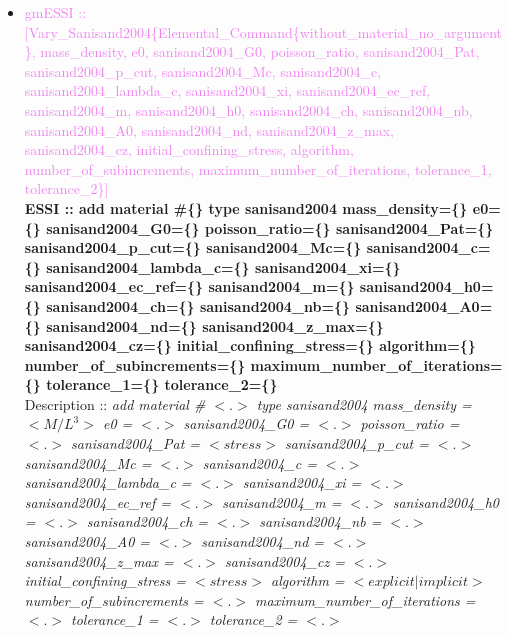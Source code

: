 \documentclass[11pt]{article}
\begin{document}
\begin{itemize}
    \item \textcolor{violet}{gmESSI :: [Vary\_Sanisand2004\{Elemental\_Command\{without\_material\_no\_argument\}, mass\_density, e0, sanisand2004\_G0, poisson\_ratio, sanisand2004\_Pat, sanisand2004\_p\_cut, sanisand2004\_Mc, sanisand2004\_c, sanisand2004\_lambda\_c, sanisand2004\_xi, sanisand2004\_ec\_ref, sanisand2004\_m, sanisand2004\_h0, sanisand2004\_ch, sanisand2004\_nb, sanisand2004\_A0, sanisand2004\_nd, sanisand2004\_z\_max, sanisand2004\_cz, initial\_confining\_stress, algorithm, number\_of\_subincrements, maximum\_number\_of\_iterations, tolerance\_1, tolerance\_2\}]}\\
    \textbf{ESSI :: add material \#\{\} type sanisand2004 mass\_density=\{\} e0=\{\} sanisand2004\_G0=\{\} poisson\_ratio=\{\} sanisand2004\_Pat=\{\}  sanisand2004\_p\_cut=\{\}  sanisand2004\_Mc=\{\}  sanisand2004\_c=\{\} sanisand2004\_lambda\_c=\{\} sanisand2004\_xi=\{\}  sanisand2004\_ec\_ref=\{\}  sanisand2004\_m=\{\}  sanisand2004\_h0=\{\} sanisand2004\_ch=\{\}  sanisand2004\_nb=\{\} sanisand2004\_A0=\{\} sanisand2004\_nd=\{\} sanisand2004\_z\_max=\{\}  sanisand2004\_cz=\{\} initial\_confining\_stress=\{\}  algorithm=\{\}  number\_of\_subincrements=\{\}  maximum\_number\_of\_iterations=\{\}  tolerance\_1=\{\}  tolerance\_2=\{\}}\\
    Description ::  \textit{ add material \# $<.>$ type sanisand2004 mass\_density = $<M/L^3>$ e0 = $<.>$ sanisand2004\_G0 = $<.>$ poisson\_ratio = $<.>$ sanisand2004\_Pat = $<stress>$  sanisand2004\_p\_cut = $<.>$  sanisand2004\_Mc = $<.>$  sanisand2004\_c = $<.>$ sanisand2004\_lambda\_c = $<.>$ sanisand2004\_xi = $<.>$  sanisand2004\_ec\_ref = $<.>$  sanisand2004\_m = $<.>$  sanisand2004\_h0 = $<.>$ sanisand2004\_ch = $<.>$  sanisand2004\_nb = $<.>$ sanisand2004\_A0 = $<.>$ sanisand2004\_nd = $<.>$ sanisand2004\_z\_max = $<.>$  sanisand2004\_cz = $<.>$ initial\_confining\_stress = $<stress>$  algorithm = $<explicit|implicit>$  number\_of\_subincrements = $<.>$  maximum\_number\_of\_iterations = $<.>$  tolerance\_1 = $<.>$  tolerance\_2 = $<.>$} 


\end{itemize}
\end{document}

